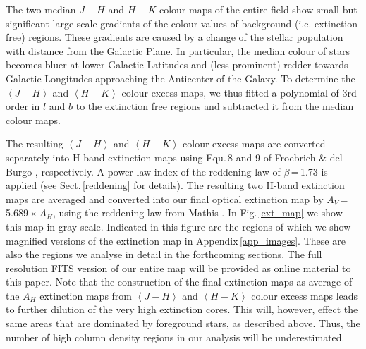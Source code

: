 \documentclass[useAMS,usenatbib]{mn2e}
\begin{document}
The two median $J-H$ and $H-K$ colour maps of the entire field show small but
significant large-scale gradients of the colour values of background (i.e.
extinction free) regions. These gradients are caused by a change of the stellar
population with distance from the Galactic Plane. In particular, the median
colour of stars becomes bluer at lower Galactic Latitudes and (less prominent)
redder towards Galactic Longitudes approaching the Anticenter of the Galaxy. To
determine the $\left< J-H \right>$ and $\left< H-K \right>$ colour excess maps,
we thus fitted a polynomial of 3rd order in $l$ and $b$ to the extinction free
regions and subtracted it from the median colour maps. 

The resulting $\left< J-H \right>$ and $\left< H-K \right>$ colour excess maps
are converted separately into H-band extinction maps using Equ.\,8 and 9 of
Froebrich \& del Burgo \cite{2006MNRAS.369.1901F}, respectively. A power law
index of the reddening law of $\beta$\,=\,1.73 is applied (see
Sect.\,\ref{reddening} for details). The resulting two H-band extinction maps
are averaged and converted into our final optical extinction map by
$A_V$\,=\,5.689\,$\times$\,$A_H$, using the reddening law from Mathis
\cite{1990ARA&A..28...37M}. In Fig.\,\ref{ext_map} we show this map in
gray-scale. Indicated in this figure are the regions of which we show magnified
versions of the extinction map in Appendix\,\ref{app_images}. These are also the
regions we analyse in detail in the forthcoming sections. The full resolution
FITS version of our entire map will be provided as online material to this
paper. Note that the construction of the final extinction maps as average of the
$A_H$ extinction maps from $\left< J-H \right>$ and $\left< H-K \right>$ colour
excess maps leads to further dilution of the very high extinction cores. This
will, however, effect the same areas that are dominated by foreground stars, as
described above. Thus, the number of high column density regions in our analysis
will be underestimated.
\end{document}
